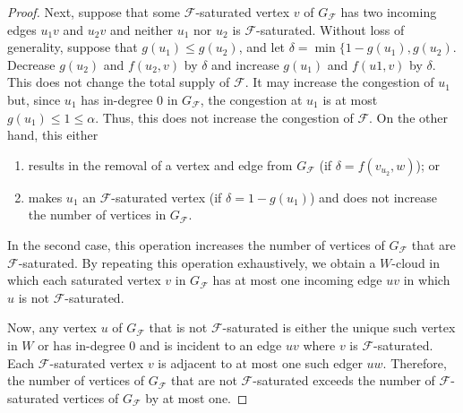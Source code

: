 \documentclass{patmorin}
\begin{document}
\begin{proof}
   Next, suppose that some $\mathcal{F}$-saturated vertex $v$ of $G_\mathcal{F}$ has two incoming edges $u_1v$ and $u_2v$ and neither $u_1$ nor $u_2$ is $\mathcal{F}$-saturated.  Without loss of generality, suppose that $g(u_1)\le g(u_2)$, and let $\delta=\min\{1-g(u_1),g(u_2)$.  Decrease $g(u_2)$ and $f(u_2,v)$ by $\delta$ and increase $g(u_1)$ and $f(u1,v)$ by $\delta$.  This does not change the total supply of $\mathcal{F}$.  It may increase the congestion of $u_1$ but, since $u_1$ has in-degree $0$ in $G_\mathcal{F}$, the congestion at $u_1$ is at most $g(u_1)\le 1\le \alpha$.  Thus, this does not increase the congestion of $\mathcal{F}$.  On the other hand, this either
   \begin{enumerate}
     \item results in the removal of a vertex and edge from $G_\mathcal{F}$ (if $\delta=f(v_{u_2},w)$); or
     \item makes $u_1$ an $\mathcal{F}$-saturated vertex (if $\delta=1-g(u_1)$) and does not increase the number of vertices in $G_\mathcal{F}$.  
  \end{enumerate}
  In the second case, this operation increases the number of vertices of $G_{\mathcal{F}}$ that are $\mathcal{F}$-saturated.  By repeating this operation exhaustively, we obtain a $W$-cloud in which each saturated vertex $v$ in $G_{\mathcal{F}}$ has at most one incoming edge $uv$ in which $u$ is not $\mathcal{F}$-saturated.

   Now, any vertex $u$ of $G_{\mathcal{F}}$ that is not $\mathcal{F}$-saturated is either the unique such vertex in $W$ or has in-degree $0$ and is incident to an edge $uv$ where $v$ is $\mathcal{F}$-saturated. Each $\mathcal{F}$-saturated vertex $v$ is adjacent to at most one such edger $uw$.  Therefore, the number of vertices of $G_{\mathcal{F}}$ that are not $\mathcal{F}$-saturated exceeds the number of $\mathcal{F}$-saturated vertices of $G_{\mathcal{F}}$ by at most one.
\end{proof}






\end{document}
